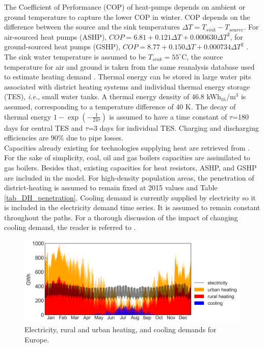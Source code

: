 \documentclass[3p]{elsarticle} %
\begin{document}
The Coefficient of Performance (COP) of heat-pumps depends on ambient or ground temperature to capture the lower COP in winter. COP depends on the difference between the source and the sink temperatures $\Delta T = T_{sink}-T_{source}$. For air-sourced heat pumps (ASHP), $COP= 6.81 + 0.121 \Delta T +  0.000630 \Delta T^2$, for ground-sourced heat pumps (GSHP), $COP=8.77 + 0.150 \Delta T + 0.000734 \Delta T^2$ \cite{Staffell_2012}. The sink water temperature is assumed to be $T_{sink}=55^{\circ}$C, the source temperature for air and ground is taken from the same reanalysis database used to estimate heating demand \cite{CFSR}. Thermal energy can be stored in large water pits associated with district heating systems and individual thermal energy storage (TES), \textit{i.e.}, small water tanks.  A thermal energy density of 46.8 kWh$_{th}$/m$^3$ is assumed, corresponding to a temperature difference of 40 K. The decay of thermal energy $1 - \exp(- \frac{1}{24 \tau})$ is assumed to have a time constant of $\tau$=180 days for central TES and $\tau$=3 days for individual TES. Charging and discharging efficiencies are 90\% due to pipe losses.\\

Capacities already existing for technologies supplying heat are retrieved from \cite{heating_capacities}. For the sake of simplicity, coal, oil and gas boilers capacities are assimilated to gas boilers. Besides that, existing capacities for heat resistors, ASHP, and GSHP are included in the model. For high-density population areas, the penetration of district-heating is assumed to remain fixed at 2015 values \cite{DH_penetration} and Table \ref{tab_DH_penetration}. Cooling demand is currently supplied by electricity so it is included in the electricity demand time series. It is assumed to remain constant throughout the paths. For a thorough discussion of the impact of changing cooling demand, the reader is referred to \cite{Zhu_2020}.


\begin{figure}[!h]
	\centering
	\includegraphics[width=0.9\columnwidth]{figures/demands.png}
	\caption{Electricity, rural and urban heating, and cooling demands for Europe.} \label{fig_demands} 
\end{figure}
\end{document}
